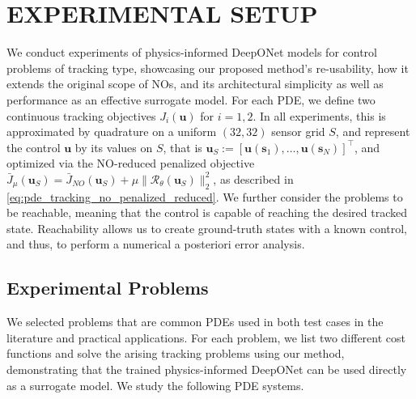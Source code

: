 \documentclass[final,1p,times]{elsarticle}
\theoremstyle{plain} %
\theoremstyle{definition} %
\theoremstyle{remark} %
\begin{document}
\section{EXPERIMENTAL SETUP} \label{section_4}
We conduct experiments of physics-informed DeepONet models for control problems of tracking type, showcasing our proposed method's re-usability, how it extends the original scope of NOs, and its architectural simplicity as well as performance as an effective surrogate model. For each PDE, we define two continuous tracking objectives $J_{i}(\mathbf{u})$ for $i=1,2$. In all experiments, this is approximated by quadrature on a uniform $(32,32)$ sensor grid $S$, and represent the control $\mathbf{u}$ by its values on $S$, that is $\mathbf{u}_S:= [\mathbf{u}(\mathbf{s}_1),\dots,\mathbf{u}(\mathbf{s}_N)]^\top$, and optimized via the NO-reduced penalized objective $\bar{J}_\mu(\mathbf{u}_S)=\bar{J}_{NO}(\mathbf{u}_S)+\mu\|\mathcal{R}_\theta(\mathbf{u}_S)\|_2^2$, as described in \eqref{eq:pde_tracking_no_penalized_reduced}. We further consider the problems to be reachable, meaning that the control is capable of reaching the desired tracked state. Reachability allows us to create ground-truth states with a known control, and thus, to perform a numerical a posteriori error analysis.


\subsection{Experimental Problems}\label{section_4.1}

We selected problems that are common PDEs used in both test cases in the literature and practical applications. For each problem, we list two different cost functions and solve the arising tracking problems using our method, demonstrating that the trained physics-informed DeepONet can be used directly as a surrogate model. We study the following PDE systems. 
\end{document}
